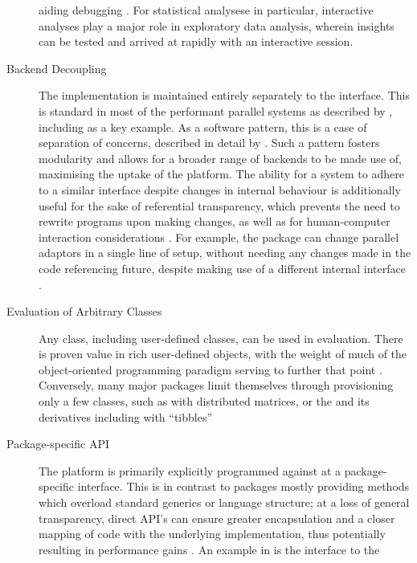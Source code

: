 \begin{description}
    aiding debugging \cite{mccarthy1978history}. For statistical analysese
    in particular, interactive analyses play a major role in exploratory
    data analysis, wherein insights can be tested and arrived at rapidly
    with an interactive session.
  \item[Backend Decoupling]
    The implementation is maintained entirely separately to the interface.
    This is standard in most of the performant parallel \R{} systems as
    described by \textcite{eddelbuettel2019parallel}, including  as a key
    example\cite{microsoft20}. As a software pattern, this is a case of
    separation of concerns, described in detail by \textcite{dijkstra1982role}.
    Such a pattern fosters modularity and allows for a broader range of
    backends to be made use of, maximising the uptake of the platform. The
    ability for a system to adhere to a similar interface despite changes in
    internal behaviour is additionally useful for the sake of referential
    transparency, which prevents the need to rewrite programs upon making
    changes, as well as for human-computer interaction considerations
    \cites{sondergaard1990Rtda,norman2013design}. For example, the 
    package can change parallel adaptors in a single line of setup, without
    needing any changes made in the code referencing future, despite making
    use of a different internal interface \cite{weston19:_using}.
  \item[Evaluation of Arbitrary Classes]
    Any class, including user-defined classes, can be used in evaluation.
    There is proven value in rich user-defined objects, with the weight of
    much of the object-oriented programming paradigm serving to further that
    point \cite{dahl2004simula}. Conversely, many major packages limit
    themselves through provisioning only a few classes, such as  with
    distributed matrices, or the  and its derivatives including
     with ``tibbles'' \cites{pbdDMATpackage,wickham2019welcome}
  \item[Package-specific API]
    The platform is primarily explicitly programmed against at a
    package-specific interface. This is in contrast to packages mostly
    providing methods which overload standard generics or language
    structure; at a loss of general transparency, direct API's can ensure
    greater encapsulation and a closer mapping of code with the underlying
    implementation, thus potentially resulting in performance gains
    \cite{bierhoff2009api}. An example in \R{} is the interface to the 

\end{description}
